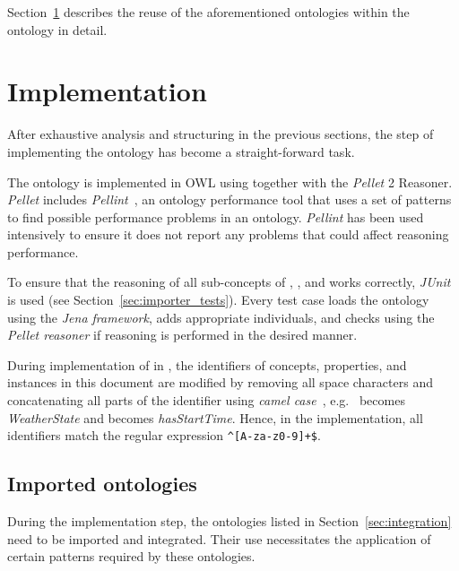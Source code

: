 Section~\ref{sec:implementation} describes the reuse of the aforementioned ontologies within the \smarthomeweather ontology in detail.

\section{Implementation}
\label{sec:implementation}


After exhaustive analysis and structuring in the previous sections, the step of implementing the ontology has become a straight-forward task.

The \smarthomeweather ontology is implemented in OWL using  together with the \emph{Pellet}  2 Reasoner. \emph{Pellet} includes \emph{Pellint}~\cite{pellint}, an ontology performance tool that uses a set of patterns to find possible performance problems in an  ontology. \emph{Pellint} has been used intensively to ensure it does not report any problems that could affect reasoning performance.

To ensure that the reasoning of all sub-concepts of , , and  works correctly, \emph{JUnit}~\cite{junit} is used (see Section~\ref{sec:importer_tests}). Every test case loads the \smarthomeweather ontology using the \emph{Jena framework}, adds appropriate individuals, and checks using the \emph{Pellet reasoner} if reasoning is performed in the desired manner.

During implementation of \smarthomeweather in , the identifiers of concepts, properties, and instances in this document are modified by removing all space characters and concatenating all parts of the identifier using \emph{camel case}~\cite{CamelCase}, e.g.\  becomes \emph{WeatherState} and  becomes \emph{hasStartTime}. Hence, in the  implementation, all identifiers match the regular expression \texttt{\textasciicircum[A-za-z0-9]+\$}.

\subsection{Imported ontologies}
\label{sec:ontology_imports}

During the implementation step, the ontologies listed in Section~\ref{sec:integration} need to be imported and integrated. Their use necessitates the application of certain patterns required by these ontologies.

